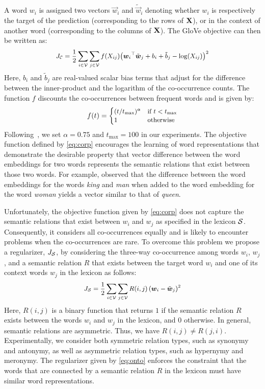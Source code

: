 \documentclass[letterpaper]{article}
\newcommand{\citet}[1]{\citeauthor{#1} \shortcite{#1}}
\begin{document}
A word $w_i$ is assigned two vectors $\vec{w}_i$ and $\tilde{\vec{w}}_i$ denoting whether $w_i$ is respectively
the target of the prediction  (corresponding to the rows of $\text{\bf X}$),
or in the context of another word (corresponding to the columns of $\text{\bf X}$).
The GloVe objective can then be written as:
\begin{equation}
\small
\label{eq:corp}
J_{\cC} = \frac{1}{2} \sum_{i \in \cV} \sum_{j \in \cV} f(X_{ij}) {\left(\vec{w}_i\T\tilde{\vec{w}}_j +b_i + \tilde{b}_j  - \log(X_{ij}) \right)}^2
\end{equation}
Here, $b_i$ and $\tilde{b}_j$ are real-valued scalar bias terms that adjust for
the difference between the inner-product and the logarithm of
the co-occurrence counts.
The function $f$ discounts the co-occurrences between frequent words and is given by:
\begin{equation}
\small
f(t) = \begin{cases} (t/t_{\max})^\alpha & \text{if $t < t_{\max}$} \\
				1 & \text{otherwise}
	\end{cases}
\end{equation}
Following~\cite{Pennington:EMNLP:2014}, we set $\alpha = 0.75$ and $t_{\max} = 100$ in our experiments.
The objective function defined by \eqref{eq:corp} encourages the learning of word representations that demonstrate the
desirable property that vector difference between the word embeddings for two words represents the semantic relations
that exist between those two words. For example, \citet{Mikolov:NAACL:2013} observed that
the difference between the word embeddings for the words \emph{king} and \emph{man} when added to the word embedding
for the word \emph{woman} yields a vector similar to that of \emph{queen}.

Unfortunately, the objective function given by \eqref{eq:corp} does not capture the semantic relations that exist between $w_i$ and $w_j$
as specified in the lexicon $\mathcal{S}$. Consequently, it considers all co-occurrences equally and is likely to encounter problems when the
co-occurrences are rare.
To overcome this problem we propose a regularizer, $J_{\mathcal{S}}$,  by considering the three-way co-occurrence
among words $w_i$, $w_j$, and a semantic relation $R$ that exists between the target word $w_i$ and
one of its context words $w_j$ in the lexicon as follows:
\begin{equation}
\small
\label{eq:onto}
J_{\cS} = \frac{1}{2} \sum_{i \in \cV}  \sum_{j \in \cV} R(i,j) \left(\vec{w}_i - \tilde{\vec{w}}_j \right)^2
\end{equation}
Here, $R(i,j)$ is a binary function that returns $1$ if  the semantic relation $R$ exists between the words $w_i$ and $w_j$
in the lexicon, and $0$ otherwise.
In general, semantic relations are asymmetric. Thus, we have $R(i,j) \neq R(j,i)$.
Experimentally, we consider both symmetric relation types, such as synonymy and antonymy, as well as
asymmetric relation types, such as hypernymy and meronymy.
The regularizer given by \eqref{eq:onto} enforces the constraint that the words that are connected by a semantic relation $R$ in the
lexicon must have similar word representations.
\end{document}
